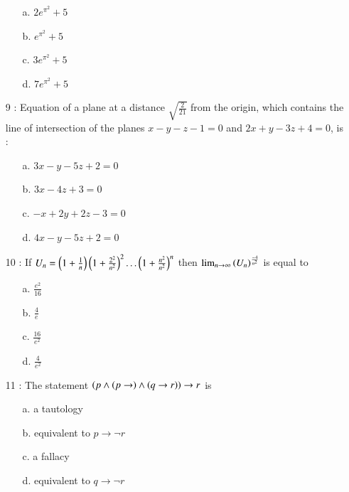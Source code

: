 \documentclass[journal]{IEEEtran}
\begin{document}
\begin{enumerate}
\begin{enumerate}
    \item [a.] $2e^{\pi ^2}+5$
    \item [b.] $e^{\pi ^2}+5$
    \item [c.] $3e^{\pi ^2}+5$
    \item [d.] $7e^{\pi ^2}+5$
\end{enumerate}
\item[9]: Equation of a plane at a distance $\sqrt{\frac{2}{21}}$ from the
origin, which contains the line of intersection of
the planes $x - y - z - 1 = 0$ and $2x + y - 3z + 4 = 0$,
is : 
\begin{enumerate}
     \item [a.] $3x-y-5z+2=0$
    \item [b.] $3x-4z+3=0$
    \item [c.] $-x+2y+2z-3=0$
    \item [d.] $4x-y-5z+2=0$
\end{enumerate}
\item[10]: If $U_n = \left(1+\frac{1}{n}\right)\left(1+\frac{2^2}{n^2}\right)^2\ldots\left(1+\frac{n^2}{n^2}\right)^n$ then $\lim_{n\rightarrow\infty}\left(U_n\right)^{\frac{-4}{n^2}}$ is equal to 
\begin{enumerate}
     \item [a.] $\frac{e^2}{16}$
    \item [b.] $\frac{4}{e}$
    \item [c.] $\frac{16}{e^2}$
    \item [d.] $\frac{4}{e^2}$
\end{enumerate}
\item[11]: The statement $\left(p\land\left(p\rightarrow\right)\land\left(q\rightarrow r\right)\right)\rightarrow r$ is
\begin{enumerate}
     \item [a.] a tautology
    \item [b.] equivalent to $p\rightarrow\neg r$
    \item [c.] a fallacy
    \item [d.] equivalent to $q\rightarrow\neg r$
\end{enumerate}


\end{enumerate}
\end{document}

